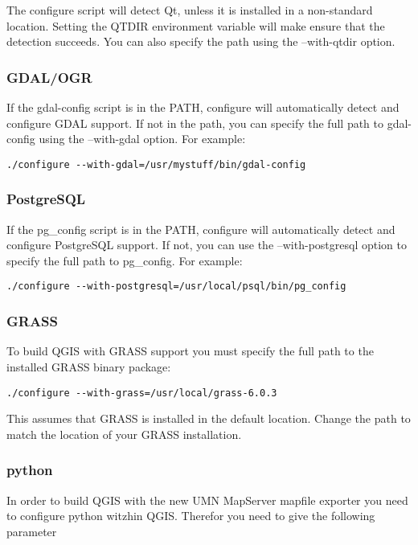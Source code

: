 The configure script will detect Qt, unless it is installed in a  
non-standard location. Setting the QTDIR environment variable will 
make ensure that the detection succeeds. You can also specify the path
using the --with-qtdir option. 
  
\subsubsection{GDAL/OGR}
 
If the gdal-config script is in the PATH, configure will automatically
detect and configure GDAL support. If not in the path, you can specify
the full path to gdal-config using the --with-gdal option. For example:

\begin{verbatim}
./configure --with-gdal=/usr/mystuff/bin/gdal-config
\end{verbatim}

\subsubsection{PostgreSQL}
  
If the pg\_config script is in the PATH, configure will automatically
detect and configure PostgreSQL support. If not, you can use the
--with-postgresql option to specify the full path to pg\_config. For example:
 
\begin{verbatim}
./configure --with-postgresql=/usr/local/psql/bin/pg_config
\end{verbatim}

\subsubsection{GRASS}
To build QGIS with GRASS support you must specify the full path to the
installed GRASS binary package:

\begin{verbatim}
./configure --with-grass=/usr/local/grass-6.0.3
\end{verbatim}

This assumes that GRASS is installed in the default location. Change the
path to match the location of your GRASS installation.
 
\subsubsection{python}
In order to build QGIS with the new UMN MapServer mapfile exporter you
need to configure python witzhin QGIS. Therefor you need to give the
following parameter

